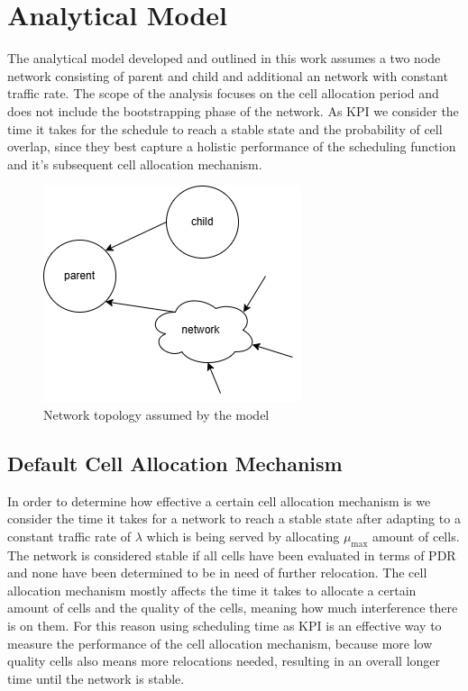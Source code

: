 \documentclass{comnets-thesis}
\begin{document}
\chapter{Analytical Model}\label{chp:model}
The analytical model developed and outlined in this work assumes a two node network consisting of parent and child and additional an network with constant traffic rate. The scope of the analysis focuses on the cell allocation period and does not include the bootstrapping phase of the network.
As \ac{KPI} we consider the time it takes for the schedule to reach a stable state and the probability of cell overlap, since they best capture a holistic performance of the scheduling function and it's subsequent cell allocation mechanism.

\begin{figure}[H]
    \centering
    \includegraphics[scale=0.7]{./images/network_outline.png}
    \caption{Network topology assumed by the model}
    \label{fig:analytical-network-model}
\end{figure}


\section{ Default Cell Allocation Mechanism }
In order to determine how effective a certain cell allocation mechanism is we consider the time it takes for a network to reach a stable state after adapting to a constant traffic rate of $\lambda$ which is being served by allocating $\mu_{\max}$ amount of cells. The network is considered stable if all cells have been evaluated in terms of \ac{PDR} and none have been determined to be in need of further relocation. 
The cell allocation mechanism mostly affects the time it takes to allocate a certain amount of cells and the quality of the cells, meaning how much interference there is on them. For this reason using scheduling time as \ac{KPI} is an effective way to measure the performance of the cell allocation mechanism, because more low quality cells also means more relocations needed, resulting in an overall longer time until the network is stable. 
\end{document}
